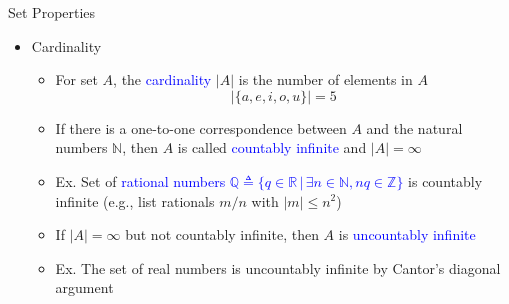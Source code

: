 \documentclass[10pt,english]{beamer}
\begin{document}
\begin{frame}{Set Properties}

\begin{itemize}
\setlength\itemsep{3mm}

\item<1-> Cardinality \vspace{1mm}
\begin{itemize} 
  \setlength\itemsep{1.5mm}
  \item For set $A$, the \textcolor{blue}{cardinality} $|A|$ is the number of elements in $A$
  \[ |\{ a,e,i,o,u \}| = 5 \]
  \item If there is a one-to-one correspondence between $A$ and the natural numbers $\mathbb{N}$, then $A$ is called \textcolor{blue}{countably infinite} and  $|A| = \infty$
  \item Ex. Set of \textcolor{blue}{rational numbers $\mathbb{Q} \triangleq \{ q \in \mathbb{R} \,|\, \exists n \in \mathbb{N}, nq \in \mathbb{Z} \}$} is countably infinite (e.g., list rationals $m/n$ with $|m|\leq n^2$)
  \item If $|A| = \infty$ but not countably infinite, then $A$ is \textcolor{blue}{uncountably infinite}
  \item Ex. The set of real numbers is uncountably infinite by Cantor's diagonal argument
  
\end{itemize}
\end{itemize}
\end{frame}

\def\firstcircle{(0,0) circle (1.5cm)}
\def\secondcircle{(0:2cm) circle (1.5cm)}


\end{document}
